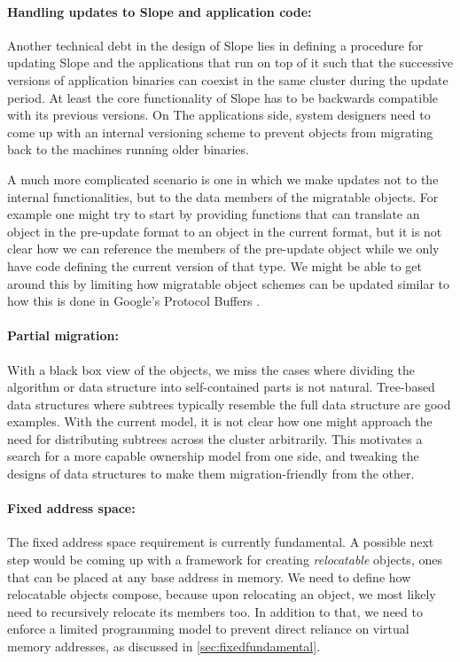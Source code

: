 \paragraph{Handling updates to Slope and application code:} Another technical
debt in the design of Slope lies in defining a procedure for updating Slope and
the applications that run on top of it such that the successive versions of
application binaries can coexist in the same cluster during the update period.
At least the core
functionality of Slope has to be backwards compatible with its previous versions.
On The applications side, system designers need to come up with an internal versioning
scheme to prevent objects from migrating back to the machines running older
binaries.

A much more complicated scenario
is one in which we make updates not to the internal functionalities, but to the
data members of the migratable objects. For example one might try to start by
providing functions that can translate an object in the pre-update format to an
object
in the current format, but it is not clear how we can reference the members of the
pre-update object while we only have code defining the current version of that type.
We might be able to get around this by limiting how migratable object schemes can be
updated similar to how this is done in Google's Protocol Buffers \cite{google:protobuf}.


\paragraph{Partial migration:}
With a black box view of the objects, we miss the cases where dividing the
algorithm or data structure into self-contained parts is not natural.
Tree-based data structures where subtrees typically resemble the full data
structure are good examples. With the current model, it is not
clear how one might approach the need for distributing subtrees across the
cluster arbitrarily. This motivates a search for a more capable ownership model
from one side, and tweaking the designs of data structures to make them
migration-friendly from the other.

\paragraph{Fixed address space:}
The fixed address space requirement is currently fundamental. A possible next
step would be coming up with a framework for creating \emph{relocatable}
objects, ones that can be placed at any base address in memory. We need
to define how relocatable objects compose, because upon relocating an object,
we most likely need to recursively relocate its members too. In addition to
that, we need to enforce a limited programming model to prevent direct reliance
on virtual memory addresses, as discussed in \autoref{sec:fixedfundamental}.

